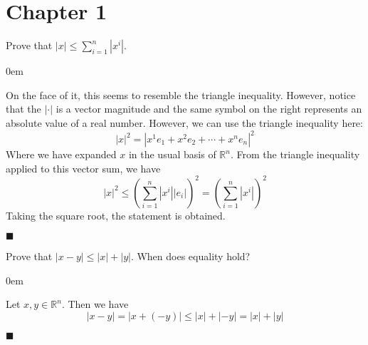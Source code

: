 \documentclass[12pt]{article}
\renewcommand{\qed}{\hfill$\blacksquare$}
\renewenvironment{proof}{\begin{addmargin}[1em]{0em}\begin{newproof}}{\end{newproof}\end{addmargin}\qed}
\newenvironment{problem}[2][Problem]{\begin{trivlist}
\item[\hskip \labelsep {\bfseries #1}\hskip \labelsep {\bfseries #2.}]}{\end{trivlist}}
\begin{document}
 

\rhead{\today}
 


\section*{Chapter 1}


\begin{problem}{1.1} Prove that $\left|x\right| \leq \sum_{i=1}^n \left| x^i\right|$.
\end{problem}

\begin{proof}
On the face of it, this seems to resemble the triangle inequality. However, notice that the $\left| \cdot \right|$ is a vector magnitude and the same symbol on the right represents an absolute value of a real number. However, we can use the triangle inequality here:
\begin{equation*}
\left| x \right|^2  = \left| x^1 e_1 + x^2 e_2 + \cdots + x^n e_n \right|^2
\end{equation*}
Where we have expanded $x$ in the usual basis of $\mathbb{R}^n$. From the triangle inequality applied to this vector sum, we have
\begin{equation*}
\left|x\right|^2 \leq \left(\sum_{i=1}^n \left|x^i\right| \left| e_i \right| \right)^2 = \left(\sum_{i=1}^n \left|x^i \right|\right)^2
\end{equation*}
Taking the square root, the statement is obtained.
\end{proof}



\begin{problem}{1.3}
Prove that $\left|x-y\right| \leq \left|x\right| + \left|y\right|$. When does equality hold?
\end{problem}

\begin{proof}
Let $x,y \in \mathbb{R}^n$. Then we have
$$ \left|x-y\right| = \left|x + \left(-y\right)\right| \leq \left|x\right| + \left| -y\right| = \left|x\right| + \left| y\right| $$
\end{proof}
\end{document}
